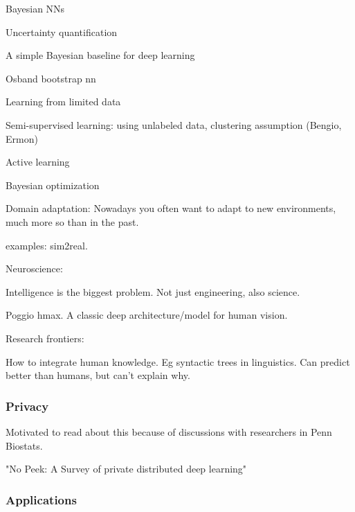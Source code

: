 \documentclass[english]{article}
\begin{document}
\benum 


\item Bayesian NNs

Uncertainty quantification

A simple Bayesian baseline for deep learning

Osband bootstrap nn
\item Learning from limited data

 Semi-supervised learning: using unlabeled data, clustering assumption (Bengio, Ermon)

 Active learning

\item Bayesian optimization

\item Domain adaptation: Nowadays you often want to adapt to new environments, much more so than in the past. 

examples: sim2real. 

\item Neuroscience: 

Intelligence is the biggest problem. Not just engineering, also science. 

Poggio hmax. A classic deep architecture/model for human vision.

\item Research frontiers: 

How to integrate human knowledge. Eg syntactic trees in linguistics. Can predict better than humans, but can't explain why. 

\eenum 


\subsubsection{Privacy}


\benum 
\item Motivated to read about this because of discussions with researchers in Penn Biostats.

\item "No Peek: A Survey of private distributed deep
learning"



\eenum







\subsubsection{Applications}
\end{document}
